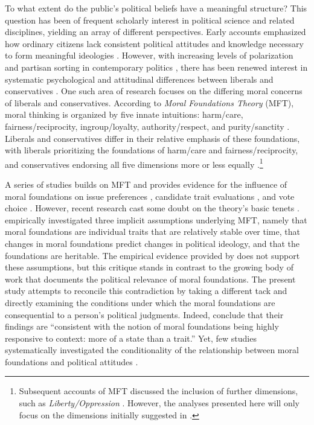 \documentclass[12pt]{article}
\begin{document}
To what extent do the public's political beliefs have a meaningful structure? This question has been of frequent scholarly interest in political science and related disciplines, yielding an array of different perspectives. Early accounts emphasized how ordinary citizens lack consistent political attitudes and knowledge necessary to form meaningful ideologies \citep{converse1964nature}. However, with increasing levels of polarization and partisan sorting in contemporary politics \citep[e.g.][]{mason2014disrespectfully}, there has been renewed interest in systematic psychological and attitudinal differences between liberals and conservatives \citep{jost2006end}. One such area of research focuses on the differing moral concerns of liberals and conservatives. According to \textit{Moral Foundations Theory} (MFT), moral thinking is organized by five innate intuitions: harm/care, fairness/reciprocity, ingroup/loyalty, authority/respect, and purity/sanctity \citep{haidt2008moral,graham2011mapping}. Liberals and conservatives differ in their relative emphasis of these foundations, with liberals prioritizing the foundations of harm/care and fairness/reciprocity, and conservatives endorsing all five dimensions more or less equally \citep{graham2009liberals}.\footnote{Subsequent accounts of MFT discussed the inclusion of further dimensions, such as \textit{Liberty/Oppression} \citep[c.f.,][]{graham2013moral,haidt2012righteous}. However, the analyses presented here will only focus on the dimensions initially suggested in \citet{haidt2008moral}.}

A series of studies builds on MFT and provides evidence for the influence of moral foundations on issue preferences \citep{koleva2012tracing, kertzer2014moral, low2015moral, clifford2015concerns}, candidate trait evaluations \citep{clifford2014linking}, and vote choice \citep{iyer2010beyond, franks2015using}. However, recent research cast some doubt on the theory's basic tenets \citep[e.g.,][]{suhler2011can}. \citet{smith2016intuitive} empirically investigated three implicit assumptions underlying MFT, namely that moral foundations are individual traits that are relatively stable over time, that changes in moral foundations predict changes in political ideology, and that the foundations are heritable. The empirical evidence provided by \citet{smith2016intuitive} does not support these assumptions, but this critique stands in contrast to the growing body of work that documents the political relevance of moral foundations. The present study attempts to reconcile this contradiction by taking a different tack and directly examining the conditions under which the moral foundations are consequential to a person's political judgments. Indeed, \citet{smith2016intuitive} conclude that their findings are ``consistent with the notion of moral foundations being highly responsive to context: more of a state than a trait.'' Yet, few studies systematically investigated the conditionality of the relationship between moral foundations and political attitudes \citep[see][for a notable exception]{clifford2015concerns}.
\end{document}

